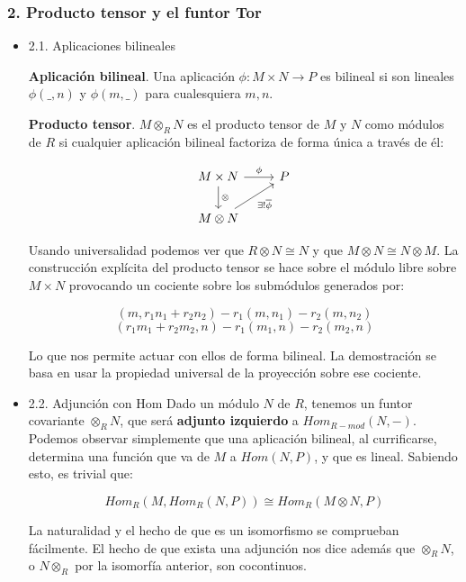 \documentclass[11pt]{article}
\begin{document}
\subsubsection*{2. Producto tensor y el funtor Tor}
\label{sec-4-4-2}
\begin{itemize}
\item 2.1. Aplicaciones bilineales
\label{sec-4-4-2-1}
\begin{definition}
\textbf{Aplicación bilineal}. Una aplicación $\phi:M\times N \longrightarrow P$ es bilineal si
son lineales $\phi(\_,n)$ y $\phi(m,\_)$ para cualesquiera $m,n$.
\end{definition}

\begin{definition}
\textbf{Producto tensor}. $M \otimes_R N$ es el producto tensor de $M$ y $N$ como módulos de $R$
si cualquier aplicación bilineal factoriza de forma única a través de él:

\[ \begin{tikzcd}
 M \times N \arrow{r}{\phi} \arrow{d}{\otimes} & P \\
 M \otimes N \arrow{ru}[swap]{\exists! \overline\phi} &
 \end{tikzcd} \]
\end{definition}

Usando universalidad podemos ver que $R \otimes N \cong N$ y que $M\otimes N \cong N\otimes M$. La construcción
explícita del producto tensor se hace sobre el módulo libre sobre $M \times N$ provocando un
cociente sobre los submódulos generados por:

\[(m,r_1n_1+r_2n_2) - r_1(m,n_1) - r_2(m,n_2)\]
\[(r_1m_1+r_2m_2,n) - r_1(m_1,n) - r_2(m_2,n)\]

Lo que nos permite actuar con ellos de forma bilineal. La demostración se basa en usar
la propiedad universal de la proyección sobre ese cociente.

\item 2.2. Adjunción con Hom
\label{sec-4-4-2-2}
Dado un módulo $N$ de $R$, tenemos un funtor covariante $\otimes_R N$, que será \textbf{adjunto izquierdo}
a $Hom_{R-mod}(N,-)$. Podemos observar simplemente que una aplicación bilineal, al currificarse,
determina una función que va de $M$ a $Hom(N,P)$, y que es lineal. Sabiendo esto, es trivial
que:

\[ Hom_R(M, Hom_R(N,P)) \cong Hom_R(M \otimes N, P)\]

La naturalidad y el hecho de que es un isomorfismo se comprueban fácilmente. El hecho de
que exista una adjunción nos dice además que $\otimes_R N$, o $N\otimes_R$ por la isomorfía anterior,
son cocontinuos.


\end{itemize}
\end{document}
